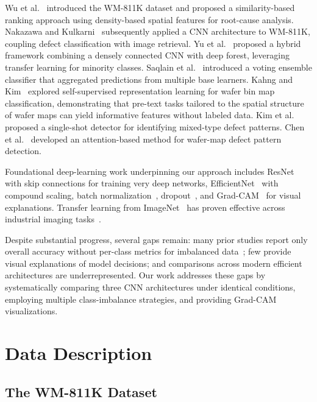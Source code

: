 \documentclass[conference]{IEEEtran}
\begin{document}
Wu et al.~\cite{wu2015} introduced the WM-811K dataset and proposed a
similarity-based ranking approach using density-based spatial features for
root-cause analysis. Nakazawa and Kulkarni~\cite{nakazawa2018} subsequently
applied a CNN architecture to WM-811K, coupling defect classification with
image retrieval. Yu et al.~\cite{yu2019} proposed a hybrid framework
combining a densely connected CNN with deep forest, leveraging transfer
learning for minority classes. Saqlain et al.~\cite{saqlain2020} introduced a
voting ensemble classifier that aggregated predictions from multiple base
learners. Kahng and Kim~\cite{kahng2021} explored self-supervised
representation learning for wafer bin map classification, demonstrating that
pre-text tasks tailored to the spatial structure of wafer maps can yield
informative features without labeled data. Kim et al.~\cite{kim2022} proposed
a single-shot detector for identifying mixed-type defect patterns. Chen et
al.~\cite{chen2023} developed an attention-based method for wafer-map defect
pattern detection.

Foundational deep-learning work underpinning our approach includes
ResNet~\cite{he2016} with skip connections for training very deep networks,
EfficientNet~\cite{tan2019} with compound scaling, batch
normalization~\cite{ioffe2015}, dropout~\cite{srivastava2014}, and
Grad-CAM~\cite{selvaraju2017} for visual explanations. Transfer learning from
ImageNet~\cite{pan2010,yosinski2014} has proven effective across industrial
imaging tasks~\cite{weimer2016}.

Despite substantial progress, several gaps remain: many prior studies report
only overall accuracy without per-class metrics for imbalanced
data~\cite{he2009,chawla2002}; few provide visual explanations of model
decisions; and comparisons across modern efficient architectures are
underrepresented. Our work addresses these gaps by systematically comparing
three CNN architectures under identical conditions, employing multiple
class-imbalance strategies, and providing Grad-CAM visualizations.

\section{Data Description}
\label{sec:data}

\subsection{The WM-811K Dataset}
\end{document}
